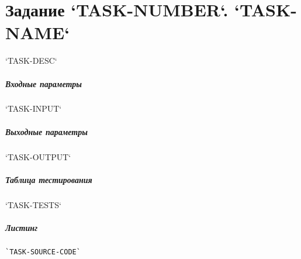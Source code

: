 \chapter*{Задание `TASK-NUMBER`. `TASK-NAME`}

`TASK-DESC`

\paragraph{Входные параметры}

`TASK-INPUT`

\paragraph{Выходные параметры}

`TASK-OUTPUT`

\paragraph{Таблица тестирования}

`TASK-TESTS`

\paragraph{Листинг}
\begin{lstlisting}
`TASK-SOURCE-CODE`
\end{lstlisting}
\\
